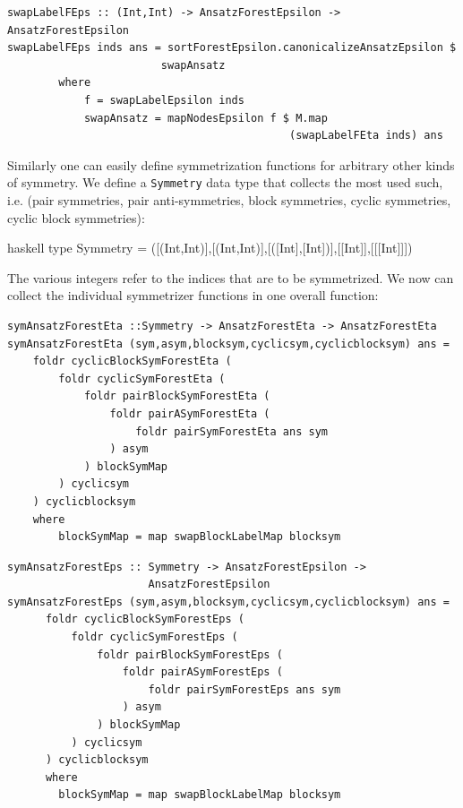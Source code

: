 \documentclass[a4paper,12pt, DIV=14, BCOR=5mm, twoside, headsepline]{scrbook}
\begin{document}
\begin{samepage}
\begin{verbatim}
swapLabelFEps :: (Int,Int) -> AnsatzForestEpsilon -> AnsatzForestEpsilon
swapLabelFEps inds ans = sortForestEpsilon.canonicalizeAnsatzEpsilon $ 
                        swapAnsatz
        where
            f = swapLabelEpsilon inds
            swapAnsatz = mapNodesEpsilon f $ M.map 
                                            (swapLabelFEta inds) ans
\end{verbatim} 
\end{samepage}

Similarly one can easily define symmetrization functions for arbitrary other kinds of symmetry. We define a \texttt{Symmetry} data type that collects the most used such, i.e. (pair symmetries, pair anti-symmetries, block symmetries, cyclic symmetries, cyclic block symmetries):
\begin{center}
\begin{cminted}{haskell}
type Symmetry = ([(Int,Int)],[(Int,Int)],[([Int],[Int])],[[Int]],[[[Int]]])
\end{cminted}
\end{center}
The various integers refer to the indices that are to be symmetrized. We now can collect the individual symmetrizer functions in one overall function:

\begin{samepage} 
\begin{verbatim}
symAnsatzForestEta ::Symmetry -> AnsatzForestEta -> AnsatzForestEta
symAnsatzForestEta (sym,asym,blocksym,cyclicsym,cyclicblocksym) ans =
    foldr cyclicBlockSymForestEta (
        foldr cyclicSymForestEta (
            foldr pairBlockSymForestEta (
                foldr pairASymForestEta (
                    foldr pairSymForestEta ans sym
                ) asym
            ) blockSymMap
        ) cyclicsym
    ) cyclicblocksym
    where
        blockSymMap = map swapBlockLabelMap blocksym
\end{verbatim} 
\end{samepage}

\begin{samepage}
\begin{verbatim}
symAnsatzForestEps :: Symmetry -> AnsatzForestEpsilon ->
                      AnsatzForestEpsilon
symAnsatzForestEps (sym,asym,blocksym,cyclicsym,cyclicblocksym) ans =
      foldr cyclicBlockSymForestEps (
          foldr cyclicSymForestEps (
              foldr pairBlockSymForestEps (
                  foldr pairASymForestEps (
                      foldr pairSymForestEps ans sym
                  ) asym
              ) blockSymMap
          ) cyclicsym
      ) cyclicblocksym
      where
        blockSymMap = map swapBlockLabelMap blocksym
\end{verbatim} 
\end{samepage}
\end{document}
